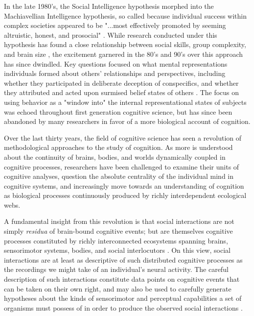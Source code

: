 \documentclass[11pt]{amsart}
\begin{document}
In the late 1980's, the Social Intelligence hypothesis morphed into the Machiavellian Intelligence hypothesis, so called because individual success within complex societies appeared to be "...most effectively promoted by seeming altruistic, honest, and prosocial" \citep{byrne:1988, byrne:1997b}. While research conducted under this hypothesis has found a close relationship between social skills, group complexity, and brain size \citep{byrne:1997a, byrne:1997b}, the excitement garnered in the 80's and 90's over this approach has since dwindled. Key questions focused on what mental representations individuals formed about others' relationships and perspectives, including whether they participated in deliberate deception of conspecifics, and whether they attributed and acted upon surmised belief states of others \citep{byrne:1988, premack:1978, forster:2012}. The focus on using behavior as a "window into" the internal representational states of subjects was echoed throughout first generation cognitive science, but has since been abandoned by many researchers in favor of a more biological account of cognition. 

Over the last thirty years, the field of cognitive science has seen a revolution of methodological approaches to the study of cognition. As more is understood about the continuity of brains, bodies, and worlds dynamically coupled in cognitive processes, researchers have been challenged to examine their units of cognitive analyses, question the absolute centrality of the individual mind in cognitive systems, and increasingly move towards an understanding of cognition as biological processes continuously produced by richly interdependent ecological webs. %

A fundamental insight from this revolution is that social interactions are not simply \textit{residua} of brain-bound cognitive events; but are themselves cognitive processes constituted by richly interconnected ecosystems spanning brains, sensorimotor systems, bodies, and social interlocutors \citep{hutchins:1995b,hutchins:2006}. On this view, social interactions are at least as descriptive of such distributed cognitive processes as the recordings we might take of an individual's neural activity. The careful description of such interactions constitute data points on cognitive events that can be taken on their own right, and may also be used to carefully generate hypotheses about the kinds of sensorimotor and perceptual capabilities a set of organisms must possess of in order to produce the observed social interactions \citep{byrne:2001, johnson:2001, johnson:2001b, king:2003, forster:2006, forster:2012}. 
\end{document}
